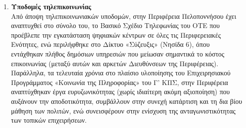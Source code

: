 \documentclass[12pt]{article}
\begin{document}
\begin{enumerate}
		\item \textbf{Υποδομές τηλεπικοινωνίας} \\
		Από άποψη τηλεπικοινωνιακών υποδομών, στην Περιφέρεια Πελοποννήσου έχει αναπτυχθεί στο σύνολο του, το Βασικό Σχέδιο Τηλεφωνίας του ΟΤΕ που προέβλεπε την εγκατάσταση ψηφιακών κέντρων σε όλες τις Περιφερειακές Ενότητες, ενώ περιλήφθηκε στο Δίκτυο «Σύζευξις» (Νησίδα 6), όπου εντάχθηκαν πλήθος δημόσιων υπηρεσιών που μείωσαν σημαντικά το κόστος επικοινωνίας (μεταξύ αυτών και αρκετών Διευθύνσεων της Περιφέρειας). Παράλληλα, τα τελευταία χρόνια στο πλαίσιο υλοποίησης του Επιχειρησιακού Προγράμματος «Κοινωνία της Πληροφορίας» του Γ' ΚΠΣ, στην Περιφέρεια αναπτύχθηκαν έργα ευρυζωνικότητας (χωρίς ιδιαίτερη ακόμη αξιοποίηση) που αυξάνουν την αποδοτικότητα, συμβάλλουν στην συνεχή κατάρτιση και τη δια βίου μάθηση των πολιτών, ενώ συνεισφέρουν στην ενίσχυση της ανταγωνιστικότητας των τοπικών επιχειρήσεων.
		

\end{enumerate}
\end{document}
